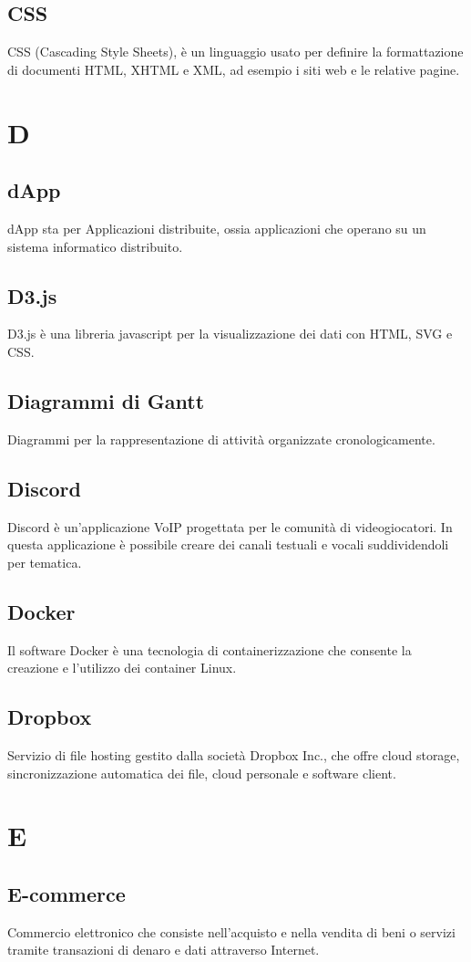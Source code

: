 \subsection{CSS} CSS (Cascading Style Sheets), è un linguaggio usato per definire la formattazione di documenti HTML, XHTML e XML, ad esempio i siti web e le relative pagine.
\newpage \section{D}
\subsection{dApp} dApp sta per Applicazioni distribuite, ossia applicazioni che operano su un sistema informatico distribuito.
\subsection{D3.js} D3.js è una libreria javascript per la visualizzazione dei dati con HTML, SVG e CSS.
\subsection{Diagrammi di Gantt} Diagrammi per la rappresentazione di attività organizzate cronologicamente.
\subsection{Discord} Discord è un’applicazione VoIP progettata per le comunità di videogiocatori. In questa applicazione è possibile creare dei canali testuali e vocali suddividendoli per tematica.
\subsection{Docker} Il software Docker è una tecnologia di containerizzazione che consente la creazione e l’utilizzo dei container Linux.
\subsection{Dropbox} Servizio di file hosting gestito dalla società Dropbox Inc., che offre cloud storage, sincronizzazione automatica dei file, cloud personale e software client.
\newpage \section{E}
\subsection{E-commerce} Commercio elettronico che consiste nell'acquisto e nella vendita di beni o servizi tramite transazioni di denaro e dati attraverso Internet.
